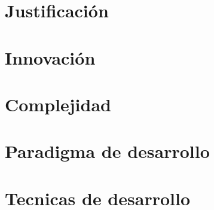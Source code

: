 \documentclass[10pt,executivepaper]{article}
\begin{document}
\section{Justificación}
\section{Innovación}
\section{Complejidad}
\section{Paradigma de desarrollo}
\section{Tecnicas de desarrollo}









\printindex
\end{document}
